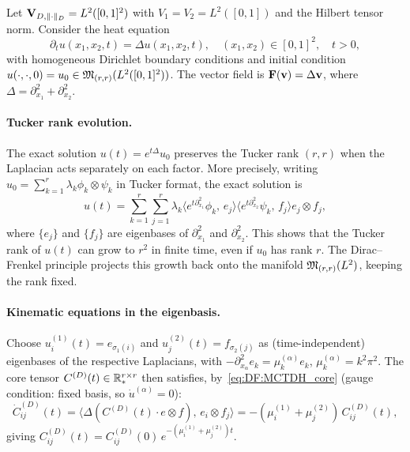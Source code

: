 \begin{example}
\label{ex:DF:heat}
Let $\mathbf{V}_{D,\|\cdot\|_D} = L^2([0,1]^2)$ with $V_1 = V_2 = L^2([0,1])$ and
the Hilbert tensor norm. Consider the heat equation
\begin{equation}
\label{eq:DF:heat}
    \partial_t u(x_1,x_2,t) = \Delta u(x_1,x_2,t),
    \quad (x_1,x_2) \in [0,1]^2,\quad t > 0,
\end{equation}
with homogeneous Dirichlet boundary conditions and initial condition
$u(\cdot,\cdot,0) = u_0 \in \mathfrak{M}_{(r,r)}(L^2([0,1]^2))$.
The vector field is $\mathbf{F}(\mathbf{v}) = \Delta \mathbf{v}$, where
$\Delta = \partial_{x_1}^2 + \partial_{x_2}^2$.

\paragraph{Tucker rank evolution.}
The exact solution $u(t) = e^{t\Delta}u_0$ preserves the Tucker rank
$(r,r)$ when the Laplacian acts separately on each factor. More
precisely, writing $u_0 = \sum_{k=1}^r \lambda_k \phi_k \otimes \psi_k$
in Tucker format, the exact solution is
\begin{equation*}
    u(t) = \sum_{k=1}^r
    \sum_{j=1}^r \lambda_k
    \langle e^{t\partial_{x_1}^2}\phi_k,\, e_j\rangle
    \langle e^{t\partial_{x_2}^2}\psi_k,\, f_j\rangle
    e_j \otimes f_j,
\end{equation*}
where $\{e_j\}$ and $\{f_j\}$ are eigenbases of $\partial_{x_1}^2$
and $\partial_{x_2}^2$. This shows that the Tucker rank of $u(t)$ can
grow to $r^2$ in finite time, even if $u_0$ has rank $r$. The
Dirac--Frenkel principle projects this growth back onto the manifold
$\mathfrak{M}_{(r,r)}(L^2)$, keeping the rank fixed.

\paragraph{Kinematic equations in the eigenbasis.}
Choose $u^{(1)}_{i}(t) = e_{\sigma_1(i)}$ and $u^{(2)}_j(t) =
f_{\sigma_2(j)}$ as (time-independent) eigenbases of the respective
Laplacians, with $-\partial_{x_\alpha}^2 e_k = \mu_k^{(\alpha)} e_k$,
$\mu_k^{(\alpha)} = k^2\pi^2$. The core tensor $C^{(D)}(t)
\in \mathbb{R}^{r \times r}_*$ then satisfies, by~\eqref{eq:DF:MCTDH_core}
(gauge condition: fixed basis, so $\dot{u}^{(\alpha)} = 0$):
\begin{equation}
\label{eq:DF:heat_core}
    \dot{C}^{(D)}_{ij}(t)
    = \langle \Delta(C^{(D)}(t) \cdot e \otimes f),\, e_i \otimes f_j\rangle
    = -(\mu_i^{(1)} + \mu_j^{(2)})\, C^{(D)}_{ij}(t),
\end{equation}
giving $C^{(D)}_{ij}(t) = C^{(D)}_{ij}(0)\, e^{-(\mu_i^{(1)}
+ \mu_j^{(2)})t}$.


\end{example}
